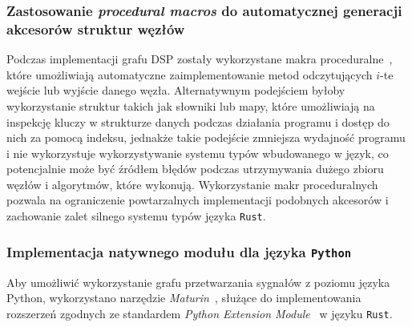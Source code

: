 \subsubsection{Zastosowanie \textit{procedural macros} do automatycznej generacji akcesorów struktur węzłów}\label{sec:proc_macro}

Podczas implementacji grafu DSP zostały wykorzystane makra proceduralne~\cite{proc_macro},
które umożliwiają automatyczne zaimplementowanie metod odczytujących $i$-te wejście
lub wyjście danego węzła. Alternatywnym podejściem byłoby wykorzystanie struktur takich
jak słowniki lub mapy, które umożliwiają na inspekcję kluczy w strukturze danych podczas
działania programu i dostęp do nich za pomocą indeksu, jednakże takie podejście zmniejsza
wydajność programu i nie wykorzystuje wykorzystywanie systemu typów wbudowanego w język,
co potencjalnie może być źródłem błędów podczas utrzymywania dużego zbioru węzłów i algorytmów,
które wykonują. Wykorzystanie makr proceduralnych pozwala na ograniczenie powtarzalnych
implementacji podobnych akcesorów i zachowanie zalet silnego systemu typów języka
\texttt{Rust}. %

\subsubsection{Implementacja natywnego modułu dla języka \texttt{Python}}

Aby umożliwić wykorzystanie grafu przetwarzania sygnałów z poziomu języka
Python, wykorzystano narzędzie \textit{Maturin}~\cite{maturin}, służące
do implementowania rozszerzeń zgodnych ze standardem \textit{Python Extension Module}~\cite{python_extension_module}
w języku \texttt{Rust}.

